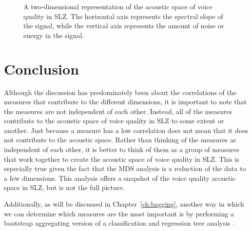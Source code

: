\begin{figure}[h!]
    \centering
    \caption{A two-dimensional representation of the acoustic space of voice quality in SLZ. The horizontal axis represents the spectral slope of the signal, while the vertical axis represents the amount of noise or energy in the signal.}
    \label{fig:acoustic_space}
\end{figure}


\section{Conclusion} \label{sec:acousticlandscape:conclusion}

Although the discussion has predominately been about the correlations of the measures that contribute to the different dimensions, it is important to note that the measures are not independent of each other. Instead, all of the measures contribute to the acoustic space of voice quality in SLZ to some extent or another. Just because a measure has a low correlation does not mean that it does not contribute to the acoustic space. Rather than thinking of the measures as independent of each other, it is better to think of them as a group of measures that work together to create the acoustic space of voice quality in SLZ. This is especially true given the fact that the MDS analysis is a reduction of the data to a few dimensions. This analysis offers a snapshot of the voice quality acoustic space in SLZ, but is not the full picture. 

Additionally, as will be discussed in Chapter~\ref{ch:bagging}, another way in which we can determine which measures are the most important is by performing a bootstrap aggregating version of a classification and regression tree analysis \citep{breimanClassificationRegressionTrees1986,breimanBaggingPredictors1996,breimanRandomForests2001}.